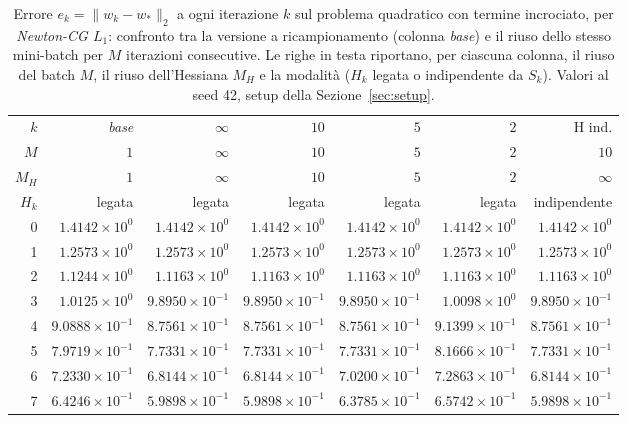 \begin{table}[H]
\centering
\footnotesize
\renewcommand{\arraystretch}{0.85}
\setlength{\tabcolsep}{2pt}
\caption{Errore $e_k=\|w_k-w_*\|_2$ a ogni iterazione $k$ sul problema quadratico con termine incrociato, per \emph{Newton-CG $L_1$}: confronto tra la versione a ricampionamento (colonna \emph{base}) e il riuso dello stesso mini-batch per $M$ iterazioni consecutive. Le righe in testa riportano, per ciascuna colonna, il riuso del batch $M$, il riuso dell'Hessiana $M_H$ e la modalità ($H_k$ legata o indipendente da $S_k$). Valori al seed 42, setup della Sezione~\ref{sec:setup}.}
\label{tab:riuso_offdiag_l1}
\begin{tabular}{@{}rrrrrrr@{}}
\toprule
$k$ & \emph{base} & $\infty$ & $10$ & $5$ & $2$ & H ind.\\
$M$ & $1$ & $\infty$ & $10$ & $5$ & $2$ & $10$\\
$M_H$ & $1$ & $\infty$ & $10$ & $5$ & $2$ & $\infty$\\
$H_k$ & legata & legata & legata & legata & legata & indipendente\\
\midrule
0 & $1.4142\times10^{0}$ & $1.4142\times10^{0}$ & $1.4142\times10^{0}$ & $1.4142\times10^{0}$ & $1.4142\times10^{0}$ & $1.4142\times10^{0}$\\
1 & $1.2573\times10^{0}$ & $1.2573\times10^{0}$ & $1.2573\times10^{0}$ & $1.2573\times10^{0}$ & $1.2573\times10^{0}$ & $1.2573\times10^{0}$\\
2 & $1.1244\times10^{0}$ & $1.1163\times10^{0}$ & $1.1163\times10^{0}$ & $1.1163\times10^{0}$ & $1.1163\times10^{0}$ & $1.1163\times10^{0}$\\
3 & $1.0125\times10^{0}$ & $9.8950\times10^{-1}$ & $9.8950\times10^{-1}$ & $9.8950\times10^{-1}$ & $1.0098\times10^{0}$ & $9.8950\times10^{-1}$\\
4 & $9.0888\times10^{-1}$ & $8.7561\times10^{-1}$ & $8.7561\times10^{-1}$ & $8.7561\times10^{-1}$ & $9.1399\times10^{-1}$ & $8.7561\times10^{-1}$\\
5 & $7.9719\times10^{-1}$ & $7.7331\times10^{-1}$ & $7.7331\times10^{-1}$ & $7.7331\times10^{-1}$ & $8.1666\times10^{-1}$ & $7.7331\times10^{-1}$\\
6 & $7.2330\times10^{-1}$ & $6.8144\times10^{-1}$ & $6.8144\times10^{-1}$ & $7.0200\times10^{-1}$ & $7.2863\times10^{-1}$ & $6.8144\times10^{-1}$\\
7 & $6.4246\times10^{-1}$ & $5.9898\times10^{-1}$ & $5.9898\times10^{-1}$ & $6.3785\times10^{-1}$ & $6.5742\times10^{-1}$ & $5.9898\times10^{-1}$\\

\end{tabular}
\end{table}
